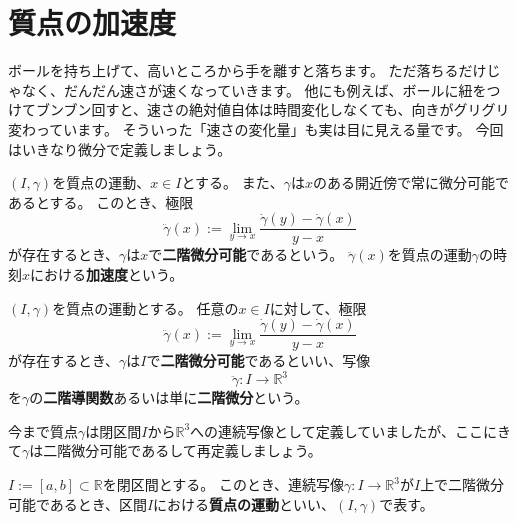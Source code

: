 \section{質点の加速度}

ボールを持ち上げて、高いところから手を離すと落ちます。
ただ落ちるだけじゃなく、だんだん速さが速くなっていきます。
他にも例えば、ボールに紐をつけてブンブン回すと、速さの絶対値自体は時間変化しなくても、向きがグリグリ変わっています。
そういった「速さの変化量」も実は目に見える量です。
今回はいきなり微分で定義しましょう。
\begin{definition}
  $(I,\gamma)$を質点の運動、$x\in I$とする。
  また、$\gamma$は$x$のある開近傍で常に微分可能であるとする。
  このとき、極限
  \[
    \ddot\gamma(x):=\lim_{y\to x}\frac{\dot\gamma(y)-\dot\gamma(x)}{y-x}
  \]
  が存在するとき、$\gamma$は$x$で\textbf{二階微分可能}であるという。
  $\ddot\gamma(x)$を質点の運動$\gamma$の時刻$x$における\textbf{加速度}という。
\end{definition}

\begin{definition}
  $(I,\gamma)$を質点の運動とする。
  任意の$x\in I$に対して、極限
  \[
    \ddot\gamma(x):=\lim_{y\to x}\frac{\dot\gamma(y)-\dot\gamma(x)}{y-x}
  \]
  が存在するとき、$\gamma$は$I$で\textbf{二階微分可能}であるといい、写像
  \[
    \ddot\gamma:I\to\mathbb{R}^3
  \]
  を$\gamma$の\textbf{二階導関数}あるいは単に\textbf{二階微分}という。
\end{definition}

今まで質点$\gamma$は閉区間$I$から$\mathbb{R}^3$への連続写像として定義していましたが、ここにきて$\gamma$は二階微分可能であるして再定義しましょう。
\begin{definition}
  $I:=[a,b]\subset\mathbb{R}$を閉区間とする。
  このとき、連続写像$\gamma:I\to\mathbb{R}^3$が$I$上で二階微分可能であるとき、区間$I$における\textbf{質点の運動}といい、$(I,\gamma)$で表す。
\end{definition}










